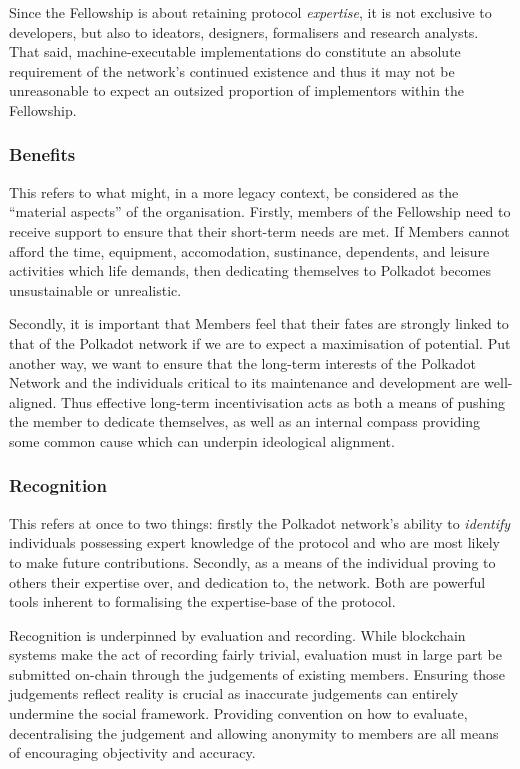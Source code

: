 \documentclass[9pt,oneside]{amsart}
\begin{document}
Since the Fellowship is about retaining protocol \textit{expertise}, it is not exclusive to developers, but also to ideators, designers, formalisers and research analysts. That said, machine-executable implementations do constitute an absolute requirement of the network's continued existence and thus it may not be unreasonable to expect an outsized proportion of implementors within the Fellowship.

\subsubsection{Benefits}

This refers to what might, in a more legacy context, be considered as the ``material aspects'' of the organisation. Firstly, members of the Fellowship need to receive support to ensure that their short-term needs are met. If Members cannot afford the time, equipment, accomodation, sustinance, dependents, and leisure activities which life demands, then dedicating themselves to Polkadot becomes unsustainable or unrealistic.

Secondly, it is important that Members feel that their fates are strongly linked to that of the Polkadot network if we are to expect a maximisation of potential. Put another way, we want to ensure that the long-term interests of the Polkadot Network and the individuals critical to its maintenance and development are well-aligned. Thus effective long-term incentivisation acts as both a means of pushing the member to dedicate themselves, as well as an internal compass providing some common cause which can underpin ideological alignment.

\subsubsection{Recognition}

This refers at once to two things: firstly the Polkadot network's ability to \emph{identify} individuals possessing expert knowledge of the protocol and who are most likely to make future contributions. Secondly, as a means of the individual proving to others their expertise over, and dedication to, the network. Both are powerful tools inherent to formalising the expertise-base of the protocol.

Recognition is underpinned by evaluation and recording. While blockchain systems make the act of recording fairly trivial, evaluation must in large part be submitted on-chain through the judgements of existing members. Ensuring those judgements reflect reality is crucial as inaccurate judgements can entirely undermine the social framework. Providing convention on how to evaluate, decentralising the judgement and allowing anonymity to members are all means of encouraging objectivity and accuracy.
\end{document}
